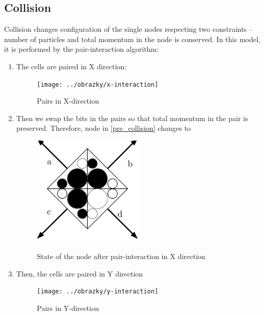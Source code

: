 \subsection{Collision}
Collision changes configuration of the single nodes respecting two constraints -- number of particles and total momentum in the node is conserved. In this model, it is performed by the pair-interaction algorithm:
\begin{enumerate}

\item The cells are paired in X direction:
\begin{figure}[H]
 \centering 
 \texttt{[image: ../obrazky/x-interaction]}
 \label{xinter}
 \caption{Pairs in X-direction}
\end{figure}

\item Then we swap the bits in the pairs so that total momentum in the pair is preserved. Therefore, node in \ref{pre_collision} changes to

\begin{figure}[H]
 \centering 
 \includegraphics[width=0.5\textwidth]{./img/node_2}
 \label{colision1}
 \caption{State of the node after pair-interaction in X direction}
\end{figure}

\item Then, the cells are paired in Y direction
\begin{figure}[htbp]
 \centering 
 \texttt{[image: ../obrazky/y-interaction]}
 \label{yinter}
 \caption{Pairs in Y-direction}
\end{figure}


\end{enumerate}
